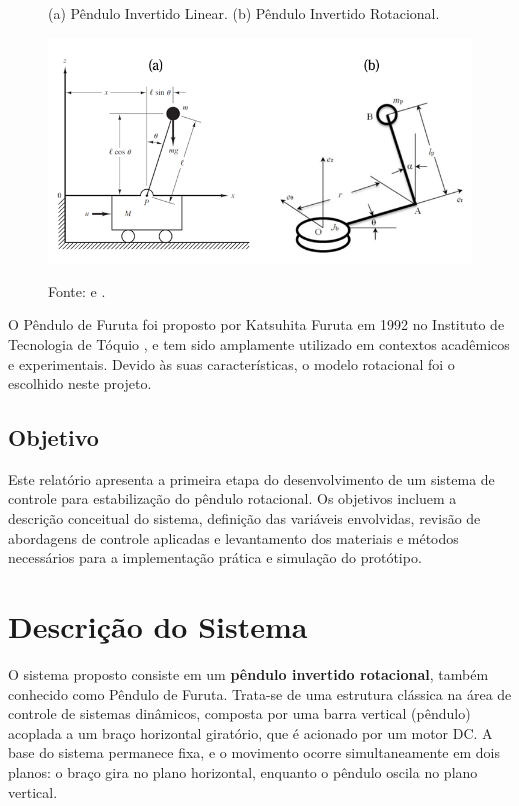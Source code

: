 \documentclass[9pt,a4paper,twocolumn,twoside]{tau-class/tau}
\begin{document}
    \begin{figure}[H]
    \centering
    \caption{(a) Pêndulo Invertido Linear. (b) Pêndulo Invertido Rotacional.}
    \includegraphics[width=0.8\columnwidth]{figures/pendulos.png} 
    \label{fig:pendulos}
    \caption*{Fonte: \cite{Ogata2010} e \cite{Nath2014}.}
\end{figure}

    O Pêndulo de Furuta foi proposto por Katsuhita Furuta em 1992 no Instituto de Tecnologia de Tóquio \cite{houck2013},
    e tem sido amplamente utilizado em contextos acadêmicos e experimentais. Devido às suas características, o modelo 
    rotacional foi o escolhido neste projeto.

    \subsection{Objetivo}

    Este relatório apresenta a primeira etapa do desenvolvimento de um sistema de controle para estabilização do pêndulo rotacional.
    Os objetivos incluem a descrição conceitual do sistema, definição das variáveis envolvidas, revisão de abordagens de controle
    aplicadas e levantamento dos materiais e métodos necessários para a implementação prática e simulação do protótipo.

\section{Descrição do Sistema}

    O sistema proposto consiste em um \textbf{pêndulo invertido rotacional}, também conhecido como Pêndulo de Furuta. Trata-se de uma estrutura clássica na área de controle de sistemas dinâmicos, composta por uma barra vertical (pêndulo) acoplada a um braço horizontal giratório, que é acionado por um motor DC. A base do sistema permanece fixa, e o movimento ocorre simultaneamente em dois planos: o braço gira no plano horizontal, enquanto o pêndulo oscila no plano vertical.
\end{document}
